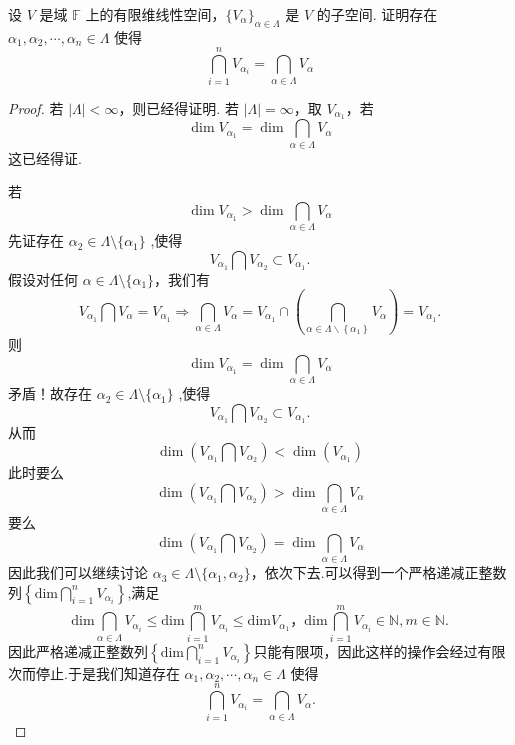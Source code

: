 \documentclass[../../main.tex]{subfiles}
\begin{document}
\begin{proposition}\label{proposition:无穷多个线性子空间的交等于有限个的交}
设 \( V \) 是域 \( \mathbb{F} \) 上的有限维线性空间，\(\{V_{\alpha}\}_{\alpha \in \Lambda}\) 是 \( V \) 的子空间. 证明存在 \(\alpha_1, \alpha_2, \cdots, \alpha_n \in \Lambda\) 使得
\[
\bigcap_{i = 1}^n V_{\alpha_i} = \bigcap_{\alpha \in \Lambda} V_{\alpha}
\]
\end{proposition}
\begin{proof}
若 \(|\Lambda| < \infty\)，则已经得证明. 若 \(|\Lambda| = \infty\)，取 \(V_{\alpha_1}\)，若
\[
\dim V_{\alpha_1} = \dim \bigcap_{\alpha \in \Lambda} V_{\alpha}
\]
这已经得证.

若
\[
\dim V_{\alpha_1} > \dim \bigcap_{\alpha \in \Lambda} V_{\alpha}
\]
先证存在 \(\alpha_2 \in \Lambda \setminus \{\alpha_1\}\) ,使得
\[
V_{\alpha_1} \bigcap V_{\alpha_2} \subset V_{\alpha_1}.
\]
假设对任何 \(\alpha \in \Lambda \setminus \{\alpha_1\}\)，我们有
\[
V_{\alpha_1} \bigcap V_{\alpha} = V_{\alpha_1}\Longrightarrow \bigcap_{\alpha \in \Lambda}{V_{\alpha}}=V_{\alpha _1}\cap \left( \bigcap_{\alpha \in \Lambda \backslash \left\{ \alpha _1 \right\}}{V_{\alpha}} \right) =V_{\alpha _1}.
\]
则
\[
\dim V_{\alpha_1} = \dim \bigcap_{\alpha \in \Lambda} V_{\alpha}
\]
矛盾！故存在 \(\alpha_2 \in \Lambda \setminus \{\alpha_1\}\) ,使得
\[
V_{\alpha_1} \bigcap V_{\alpha_2} \subset V_{\alpha_1}.
\]
从而
\[
\dim \left( V_{\alpha_1} \bigcap V_{\alpha_2} \right) < \dim \left( V_{\alpha_1} \right)
\]
此时要么
\[
\dim \left( V_{\alpha_1} \bigcap V_{\alpha_2} \right) > \dim \bigcap_{\alpha \in \Lambda} V_{\alpha}
\]
要么
\[
\dim \left( V_{\alpha_1} \bigcap V_{\alpha_2} \right) = \dim \bigcap_{\alpha \in \Lambda} V_{\alpha}
\]
因此我们可以继续讨论 \(\alpha_3 \in \Lambda \setminus \{\alpha_1, \alpha_2\}\)，依次下去.可以得到一个严格递减正整数列$\left\{ \mathrm{dim}\bigcap_{i=1}^n{V_{\alpha _i}} \right\} $,满足
\[
\mathrm{dim}\bigcap_{\alpha \in \Lambda}{V_{\alpha _i}}\leqslant \mathrm{dim}\bigcap_{i=1}^m{V_{\alpha _i}}\leqslant \mathrm{dim}V_{\alpha _1}，\mathrm{dim}\bigcap_{i=1}^m{V_{\alpha _i}}\in \mathbb{N},m\in \mathbb{N}.
\]
因此严格递减正整数列$\left\{ \mathrm{dim}\bigcap_{i=1}^n{V_{\alpha _i}} \right\}$只能有限项，因此这样的操作会经过有限次而停止.于是我们知道存在 \(\alpha_1, \alpha_2, \cdots, \alpha_n \in \Lambda\) 使得
\[
\bigcap_{i = 1}^n V_{\alpha_i} = \bigcap_{\alpha \in \Lambda} V_{\alpha}.
\]

\end{proof}
\end{document}
